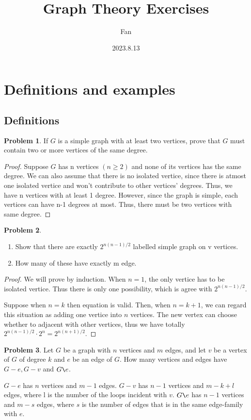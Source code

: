 \documentclass[a4paper,11pt]{article}%
\author{Fan}
\title{Graph Theory Exercises}
\date{2023.8.13}
\theoremstyle{remark}
\theoremstyle{definition}
\newtheorem{problem}{Problem}[subsection]
\begin{document}
\maketitle
\pagestyle{plain}
\tableofcontents
\printindex
\section{Definitions and examples}
\subsection{Definitions}
\begin{problem}
   If $G$ is a simple  graph with at least two vertices, prove that $G$ 
   must contain two or more vertices of the same degree. 
   \begin{proof}
    Suppose $G$ has n vertices $(n\geq 2)$ and none of its vertices has the 
    same degree. We can also assume that there is no isolated vertice, since 
    there is atmost one isolated vertice and won't contribute to 
    other vertices' degrees. Thus, we have n vertices with at least 1 degree.
    However, since the graph is simple, each vertices can have n-1 degrees at 
    most. Thus, there must be two vertices with same degree.
   \end{proof}
\end{problem}
\begin{problem}
    \begin{enumerate}
        \item Show that there are exactly $2^{n(n-1)/2}$ labelled simple graph on v vertices.
        \item How many of these have exactly m edge. 
    \end{enumerate}
    \begin{proof}
        We will prove by induction.
        When $n=1$, the only vertice has to be isolated vertice. Thus there 
        is only one possibility, which is agree with $2^{n(n-1)/2}$.

        Suppose when $n=k$ then equation is valid. Then, when $n=k+1$, 
        we can regard this situation as adding one vertice into $n$ vertices.
        The new vertex can choose whether to adjacent with other vertices, 
        thus we have totally $2^{n(n-1)/2}\cdot 2^{n}=2^{n(n+1)/2}$.
    \end{proof}
\end{problem}
\begin{problem}
    Let $G$ be a graph with $n$ vertices and $m$ edges, and let $v$ be 
    a vertex of $G$ of degree $k$ and $e$ be an edge of $G$. How many vertices 
    and edges have $G-e,G-v$ and $G\verb|\|e$.

    $G-e$ has $n$ vertices and $m-1$ edges.
    $G-v$ has $n-1$ vertices and $m-k+l$ edges, where l is the number of the loops incident with $v$.
    $G\verb|\|e$ has $n-1$ vertices and $m-s$ edges, where $s$ is the number of edges that is in the same edge-family with $e$.
\end{problem}
\end{document}
